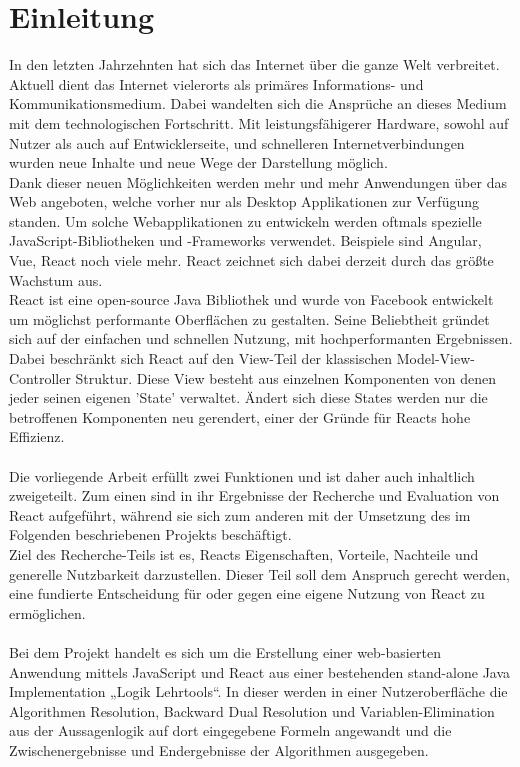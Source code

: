 
\chapter{Einleitung}\label{Einleitung}
In den letzten Jahrzehnten hat sich das Internet über die ganze Welt verbreitet. Aktuell dient das Internet vielerorts als primäres Informations- und Kommunikationsmedium. Dabei wandelten sich die Ansprüche an dieses Medium mit dem technologischen Fortschritt. Mit leistungsfähigerer Hardware, sowohl auf Nutzer als auch auf Entwicklerseite, und schnelleren Internetverbindungen wurden neue Inhalte und neue Wege der Darstellung möglich.\\
Dank dieser neuen Möglichkeiten werden mehr und mehr Anwendungen über das Web angeboten, welche vorher nur als Desktop Applikationen zur Verfügung standen. Um solche Webapplikationen zu entwickeln werden oftmals spezielle JavaScript-Bibliotheken und -Frameworks verwendet. Beispiele sind Angular, Vue, React noch viele mehr. React zeichnet sich dabei derzeit durch das größte Wachstum aus.\\
React ist eine open-source Java Bibliothek und wurde von Facebook entwickelt um möglichst performante Oberflächen zu gestalten. Seine Beliebtheit gründet sich auf der einfachen und schnellen Nutzung, mit hochperformanten Ergebnissen. Dabei beschränkt sich React auf den View-Teil der klassischen Model-View-Controller Struktur. Diese View besteht aus einzelnen Komponenten von denen jeder seinen eigenen 'State' verwaltet. Ändert sich diese States werden nur die betroffenen Komponenten neu gerendert, einer der Gründe für Reacts hohe Effizienz.\\\\
Die vorliegende Arbeit erfüllt zwei Funktionen und ist daher auch inhaltlich zweigeteilt. Zum einen sind in ihr Ergebnisse der Recherche und Evaluation von React aufgeführt, während sie sich zum anderen mit der Umsetzung des im Folgenden beschriebenen Projekts beschäftigt. \\
Ziel des Recherche-Teils ist es, Reacts Eigenschaften, Vorteile, Nachteile und generelle Nutzbarkeit darzustellen. Dieser Teil soll dem Anspruch gerecht werden, eine fundierte Entscheidung für oder gegen eine eigene Nutzung von React zu ermöglichen.\\\\
Bei dem Projekt handelt es sich um die Erstellung einer web-basierten Anwendung mittels JavaScript und React aus einer bestehenden stand-alone Java Implementation „Logik Lehrtools“. In dieser werden in einer Nutzeroberfläche die Algorithmen Resolution, Backward Dual Resolution und Variablen-Elimination aus der Aussagenlogik auf dort eingegebene Formeln angewandt und die Zwischenergebnisse und Endergebnisse der Algorithmen ausgegeben. \\
